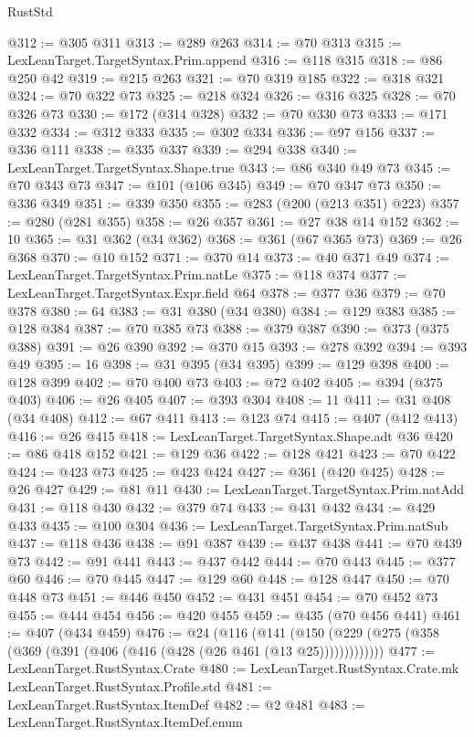 \begin{lexlean}{RustStd}
\begin{coremodule}
@312 := @305 @311
@313 := @289 @263
@314 := @70 @313
@315 := LexLeanTarget.TargetSyntax.Prim.append
@316 := @118 @315
@318 := @86 @250 @42
@319 := @215 @263
@321 := @70 @319 @185
@322 := @318 @321
@324 := @70 @322 @73
@325 := @218 @324
@326 := @316 @325
@328 := @70 @326 @73
@330 := @172 (@314 @328)
@332 := @70 @330 @73
@333 := @171 @332
@334 := @312 @333
@335 := @302 @334
@336 := @97 @156
@337 := @336 @111
@338 := @335 @337
@339 := @294 @338
@340 := LexLeanTarget.TargetSyntax.Shape.true
@343 := @86 @340 @49 @73
@345 := @70 @343 @73
@347 := @101 (@106 @345)
@349 := @70 @347 @73
@350 := @336 @349
@351 := @339 @350
@355 := @283 (@200 (@213 @351) @223)
@357 := @280 (@281 @355)
@358 := @26 @357
@361 := @27 @38 @14 @152
@362 := 10
@365 := @31 @362 (@34 @362)
@368 := @361 (@67 @365 @73)
@369 := @26 @368
@370 := @10 @152
@371 := @370 @14
@373 := @40 @371 @49
@374 := LexLeanTarget.TargetSyntax.Prim.natLe
@375 := @118 @374
@377 := LexLeanTarget.TargetSyntax.Expr.field @64
@378 := @377 @36
@379 := @70 @378
@380 := 64
@383 := @31 @380 (@34 @380)
@384 := @129 @383
@385 := @128 @384
@387 := @70 @385 @73
@388 := @379 @387
@390 := @373 (@375 @388)
@391 := @26 @390
@392 := @370 @15
@393 := @278 @392
@394 := @393 @49
@395 := 16
@398 := @31 @395 (@34 @395)
@399 := @129 @398
@400 := @128 @399
@402 := @70 @400 @73
@403 := @72 @402
@405 := @394 (@375 @403)
@406 := @26 @405
@407 := @393 @304
@408 := 11
@411 := @31 @408 (@34 @408)
@412 := @67 @411
@413 := @123 @74
@415 := @407 (@412 @413)
@416 := @26 @415
@418 := LexLeanTarget.TargetSyntax.Shape.adt @36
@420 := @86 @418 @152
@421 := @129 @36
@422 := @128 @421
@423 := @70 @422
@424 := @423 @73
@425 := @423 @424
@427 := @361 (@420 @425)
@428 := @26 @427
@429 := @81 @11
@430 := LexLeanTarget.TargetSyntax.Prim.natAdd
@431 := @118 @430
@432 := @379 @74
@433 := @431 @432
@434 := @429 @433
@435 := @100 @304
@436 := LexLeanTarget.TargetSyntax.Prim.natSub
@437 := @118 @436
@438 := @91 @387
@439 := @437 @438
@441 := @70 @439 @73
@442 := @91 @441
@443 := @437 @442
@444 := @70 @443
@445 := @377 @60
@446 := @70 @445
@447 := @129 @60
@448 := @128 @447
@450 := @70 @448 @73
@451 := @446 @450
@452 := @431 @451
@454 := @70 @452 @73
@455 := @444 @454
@456 := @420 @455
@459 := @435 (@70 @456 @441)
@461 := @407 (@434 @459)
@476 := @24
    (@116
      (@141 (@150 (@229 (@275 (@358 (@369 (@391 (@406 (@416 (@428 (@26 @461 (@13 @25)))))))))))))
@477 := LexLeanTarget.RustSyntax.Crate
@480 := LexLeanTarget.RustSyntax.Crate.mk LexLeanTarget.RustSyntax.Profile.std
@481 := LexLeanTarget.RustSyntax.ItemDef
@482 := @2 @481
@483 := LexLeanTarget.RustSyntax.ItemDef.enum

\end{coremodule}
\end{lexlean}
